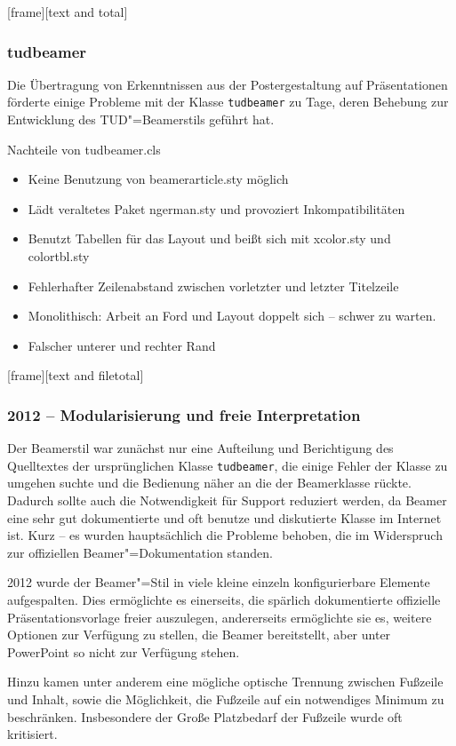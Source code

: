 [frame][text and total]
\begin{frame}[allowframebreaks]
  \frametitle{tudbeamer} Die Übertragung von Erkenntnissen aus der
  Postergestaltung auf Präsentationen förderte einige Probleme mit der
  Klasse \texttt{tudbeamer} zu Tage, deren Behebung zur Entwicklung
  des TUD"=Beamerstils geführt hat.
  \begin{block}{Nachteile von tudbeamer.cls}
    \begin{itemize}
    \item Keine Benutzung von beamerarticle.sty möglich
    \item Lädt veraltetes Paket ngerman.sty und provoziert Inkompatibilitäten
    \item Benutzt Tabellen für das Layout und beißt sich mit xcolor.sty und colortbl.sty
    \item Fehlerhafter Zeilenabstand zwischen vorletzter und letzter Titelzeile
    \item Monolithisch: Arbeit an Ford und Layout doppelt sich – schwer zu warten.
    \item Falscher unterer und rechter Rand
    \end{itemize}
  \end{block}
\end{frame}
[frame][text and filetotal]
\begin{frame}[allowframebreaks]
  \frametitle{2012 – Modularisierung und freie Interpretation}

  Der Beamerstil war zunächst nur eine Aufteilung und Berichtigung des
  Quelltextes der ursprünglichen Klasse \texttt{tudbeamer}, die einige
  Fehler der Klasse zu umgehen suchte und die Bedienung näher an die
  der Beamerklasse rückte. Dadurch sollte auch die Notwendigkeit für
  Support reduziert werden, da Beamer eine sehr gut dokumentierte und
  oft benutze und diskutierte Klasse im Internet ist. Kurz – es wurden
  hauptsächlich die Probleme behoben, die im Widerspruch zur
  offiziellen Beamer"=Dokumentation standen.

  2012 wurde der Beamer"=Stil in viele kleine einzeln konfigurierbare
  Elemente aufgespalten. Dies ermöglichte es einerseits, die spärlich
  dokumentierte offizielle Präsentationsvorlage freier auszulegen,
  andererseits ermöglichte sie es, weitere Optionen zur Verfügung zu
  stellen, die Beamer bereitstellt, aber unter PowerPoint so nicht zur
  Verfügung stehen.

  Hinzu kamen unter anderem eine mögliche optische Trennung zwischen
  Fußzeile und Inhalt, sowie die Möglichkeit, die Fußzeile auf ein
  notwendiges Minimum zu beschränken. Insbesondere der Große
  Platzbedarf der Fußzeile wurde oft kritisiert.
\end{frame}
